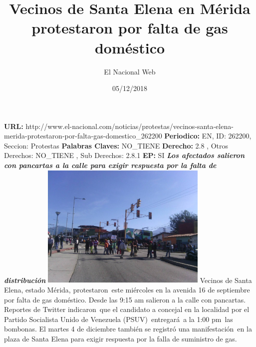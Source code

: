 \documentclass{article}%
\title{\textbf{Vecinos de Santa Elena en Mérida protestaron por falta de gas doméstico}}%
\author{El Nacional Web}%
\date{05/12/2018}%
\begin{document}
%
\normalsize%
\maketitle%
\textbf{URL: }%
http://www.el{-}nacional.com/noticias/protestas/vecinos{-}santa{-}elena{-}merida{-}protestaron{-}por{-}falta{-}gas{-}domestico\_262200\newline%
%
\textbf{Periodico: }%
EN, %
ID: %
262200, %
Seccion: %
Protestas\newline%
%
\textbf{Palabras Claves: }%
NO\_TIENE\newline%
%
\textbf{Derecho: }%
2.8%
, Otros Derechos: %
NO\_TIENE%
, Sub Derechos: %
2.8.1%
\newline%
%
\textbf{EP: }%
SI\newline%
\newline%
%
\textbf{\textit{Los afectados salieron con pancartas a la calle para exigir respuesta por la falta de distribución}}%
\newline%
\newline%
%
\includegraphics[width=300px]{4.jpg}%
\newline%
%
Vecinos de Santa Elena, estado Mérida, protestaron~este miércoles en la avenida 16 de septiembre por falta de gas doméstico. Desde las 9:15 am salieron a la calle con pancartas.%
\newline%
%
Reportes de Twitter indicaron~que el candidato a concejal en la localidad por el Partido Socialista Unido de Venezuela (PSUV)~entregará~a la 1:00 pm~las bombonas.%
\newline%
%
El martes 4 de diciembre también se registró una manifestación~en la plaza de Santa Elena para exigir respuesta por la falla de suministro de gas.%
\newline%
%
\end{document}
